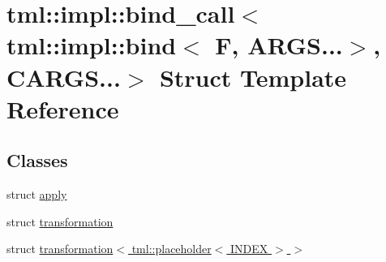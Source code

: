 \hypertarget{structtml_1_1impl_1_1bind__call_3_01tml_1_1impl_1_1bind_3_01F_00_01ARGS_8_8_8_4_00_01CARGS_8_8_8_4}{\section{tml\+:\+:impl\+:\+:bind\+\_\+call$<$ tml\+:\+:impl\+:\+:bind$<$ F, A\+R\+G\+S...$>$, C\+A\+R\+G\+S...$>$ Struct Template Reference}
\label{structtml_1_1impl_1_1bind__call_3_01tml_1_1impl_1_1bind_3_01F_00_01ARGS_8_8_8_4_00_01CARGS_8_8_8_4}
}
\subsection*{Classes}
\begin{DoxyCompactItemize}
\item 
struct \hyperlink{structtml_1_1impl_1_1bind__call_3_01tml_1_1impl_1_1bind_3_01F_00_01ARGS_8_8_8_4_00_01CARGS_8_8_8_4_1_1apply}{apply}
\item 
struct \hyperlink{structtml_1_1impl_1_1bind__call_3_01tml_1_1impl_1_1bind_3_01F_00_01ARGS_8_8_8_4_00_01CARGS_8_8_8_4_1_1transformation}{transformation}
\item 
struct \hyperlink{structtml_1_1impl_1_1bind__call_3_01tml_1_1impl_1_1bind_3_01F_00_01ARGS_8_8_8_4_00_01CARGS_8_8_8b31c1e79a178629d85ce4e534073804d}{transformation$<$ tml\+::placeholder$<$ I\+N\+D\+E\+X $>$ $>$}
\end{DoxyCompactItemize}
